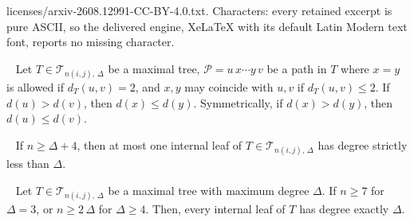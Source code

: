 \documentclass[10pt,a4paper]{amsart}
\newcommand{\TT}{\mathcal{T}}
\begin{document}
licenses/arxiv-2608.12991-CC-BY-4.0.txt. Characters: every retained excerpt is pure ASCII, so the delivered engine, XeLaTeX with its default Latin Modern text font, reports no missing character.
\begin{proposition}~\label{prop001pathmonotonicity}
Let $T\in \TT_{n(i,j),\,\Delta}$ be a maximal tree,
$\mathcal P=u\,x\cdots y\,v$ be a path in $T$ where $x=y$ is allowed if
$d_T(u,v)=2$, and $x,y$ may coincide with $u,v$ if $d_T(u,v)\leqslant 2$. If
$d(u)>d(v)$, then $d(x)\leqslant d(y)$. Symmetrically, if $d(x)>d(y)$, then
$d(u)\leqslant d(v)$.
\end{proposition}

\begin{lemma}~\label{lem001atmostoneinternalleaf}
If $n\geqslant \Delta+4$, then at most one internal leaf of $T\in \TT_{n(i,j),\,\Delta}$ has degree strictly less than $\Delta$.
\end{lemma}

\begin{theorem}~\label{thm001internal}
Let $T\in \TT_{n(i,j),\,\Delta}$ be a maximal tree with maximum degree $\Delta$. If $n\geqslant 7$ for $\Delta=3$, or $n\geqslant 2\,\Delta$ for $\Delta\geqslant 4$. Then, every internal leaf of $T$ has degree exactly $\Delta$.
\end{theorem}
\end{document}
